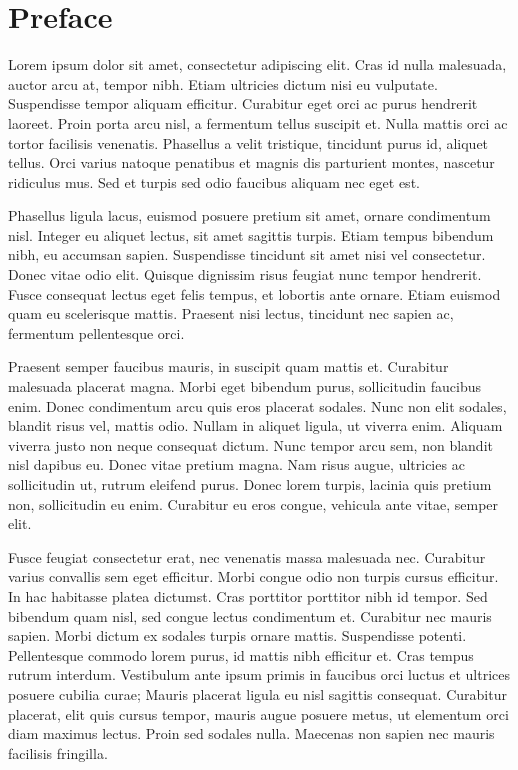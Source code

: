 \documentclass[
]{article}
\begin{document}
\clearpage

\section*{Preface}

Lorem ipsum dolor sit amet, consectetur adipiscing elit. Cras id nulla malesuada, auctor arcu at, tempor nibh. Etiam ultricies dictum nisi eu vulputate. Suspendisse tempor aliquam efficitur. Curabitur eget orci ac purus hendrerit laoreet. Proin porta arcu nisl, a fermentum tellus suscipit et. Nulla mattis orci ac tortor facilisis venenatis. Phasellus a velit tristique, tincidunt purus id, aliquet tellus. Orci varius natoque penatibus et magnis dis parturient montes, nascetur ridiculus mus. Sed et turpis sed odio faucibus aliquam nec eget est.

Phasellus ligula lacus, euismod posuere pretium sit amet, ornare condimentum nisl. Integer eu aliquet lectus, sit amet sagittis turpis. Etiam tempus bibendum nibh, eu accumsan sapien. Suspendisse tincidunt sit amet nisi vel consectetur. Donec vitae odio elit. Quisque dignissim risus feugiat nunc tempor hendrerit. Fusce consequat lectus eget felis tempus, et lobortis ante ornare. Etiam euismod quam eu scelerisque mattis. Praesent nisi lectus, tincidunt nec sapien ac, fermentum pellentesque orci.

Praesent semper faucibus mauris, in suscipit quam mattis et. Curabitur malesuada placerat magna. Morbi eget bibendum purus, sollicitudin faucibus enim. Donec condimentum arcu quis eros placerat sodales. Nunc non elit sodales, blandit risus vel, mattis odio. Nullam in aliquet ligula, ut viverra enim. Aliquam viverra justo non neque consequat dictum. Nunc tempor arcu sem, non blandit nisl dapibus eu. Donec vitae pretium magna. Nam risus augue, ultricies ac sollicitudin ut, rutrum eleifend purus. Donec lorem turpis, lacinia quis pretium non, sollicitudin eu enim. Curabitur eu eros congue, vehicula ante vitae, semper elit.

Fusce feugiat consectetur erat, nec venenatis massa malesuada nec. Curabitur varius convallis sem eget efficitur. Morbi congue odio non turpis cursus efficitur. In hac habitasse platea dictumst. Cras porttitor porttitor nibh id tempor. Sed bibendum quam nisl, sed congue lectus condimentum et. Curabitur nec mauris sapien. Morbi dictum ex sodales turpis ornare mattis. Suspendisse potenti. Pellentesque commodo lorem purus, id mattis nibh efficitur et. Cras tempus rutrum interdum. Vestibulum ante ipsum primis in faucibus orci luctus et ultrices posuere cubilia curae; Mauris placerat ligula eu nisl sagittis consequat. Curabitur placerat, elit quis cursus tempor, mauris augue posuere metus, ut elementum orci diam maximus lectus. Proin sed sodales nulla. Maecenas non sapien nec mauris facilisis fringilla.
\end{document}
